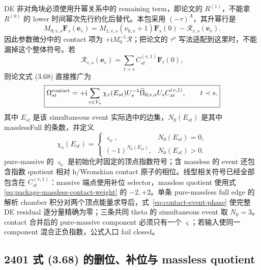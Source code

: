 \documentclass[11pt,a4paper]{ctexart}
\newcommand{\ii}{\mathrm i}
\newcommand{\cR}{\mathcal R}
\begin{document}
DE 非对角块必须使用升幂关系中的 remaining term，即论文的 $R^{(1)}$，不能拿 $R^{(0)}$ 的 lower 时间幂次先行约化后替代。本包采用 $(-\tau)^A$，其升幂行是
\begin{equation}
 M_{0;v,s}\bm F_s(\bm e_v)
 =M_{1;v,s}(\nu_{0,v}+1)\bm F_s(0)-\cR_{v,s}(\bm e_v).
 \label{eq:package-raising-contact-sign}
\end{equation}
因此参数微分中的 contact 项为 $+\ii M_0^{-1}\cR$；把论文的 $\tau^\nu$ 写法适配到这里时，不能漏掉这个整体符号。若
\begin{equation}
 \cR_{v,s}(\bm e_v)=\sum_{t\prec s}C_{st}^{(v,1)}\bm F_t(0),
\end{equation}
则论文式 (3.68) 直接推广为
\begin{equation}
 \boxed{
 \Omega_{st}^{\rm contact}
 =+\ii\sum_{v\in V_s}\chi_v(E_{st})
 U_s^{-1}\widetilde\Omega_{0;v,s}U_s
 C_{st}^{(v,1)},
 \qquad t\prec s.
 }
 \label{eq:global-offdiagonal-omega}
\end{equation}
其中 $E_{st}$ 是该 simultaneous event 实际选中的边集，$N_0(E_{st})$ 是其中 masslessFull 的条数，并定义
\begin{equation}
 \chi_v(E_{st})=
 \begin{cases}
  \varsigma_v,&N_0(E_{st})=0,\\
  (-1)^{N_0(E_{st})},&N_0(E_{st})>0.
 \end{cases}
 \label{eq:contact-event-phase}
\end{equation}
pure-massive 的 $\varsigma_v$ 是初始化时固定的顶点指数符号；含 massless 的 event 还包含指数 quotient 相对 h/Wronskian contact 原子的相位。线型相关符号已经全部包含在 $C_{st}^{(v,1)}$：massive 端点使用补位 selector，massless quotient 使用式 \eqref{eq:package-massless-contact-weight} 的 $-2,+2$。单条 pure-massless full edge 的解析 chamber 积分对两个顶点能量求导后，式~\eqref{eq:contact-event-phase} 使完整 DE residual 逐分量精确为零；三条共同 theta 的 simultaneous event 取 $N_0=3$。contact 合并后的 pure-massive component 必须只有一个 $\varsigma$；若输入使同一 component 混合正负指数，公式入口 fail closed。

\subsection{2401 式 (3.68) 的删位、补位与 massless quotient}
\end{document}
